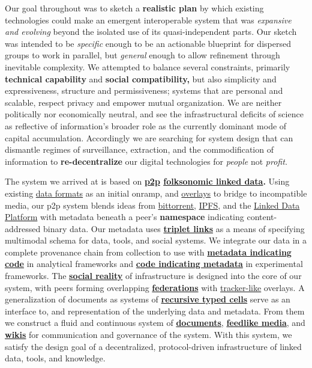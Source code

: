 Our goal throughout was to sketch a \textbf{realistic plan} by which
existing technologies could make an emergent interoperable system that
was \emph{expansive and evolving} beyond the isolated use of its
quasi-independent parts. Our sketch was intended to be \emph{specific}
enough to be an actionable blueprint for dispersed groups to work in
parallel, but \emph{general} enough to allow refinement through
inevitable complexity. We attempted to balance several constraints,
primarily \textbf{technical capability} and \textbf{social
compatibility,} but also simplicity and expressiveness, structure and
permissiveness; systems that are personal and scalable, respect privacy
and empower mutual organization. We are neither politically nor
economically neutral, and see the infrastructural deficits of science as
reflective of information's broader role as the currently dominant mode
of capital accumulation. Accordingly we are searching for system design
that can dismantle regimes of surveillance, extraction, and the
commodification of information to \textbf{re-decentralize} our digital
technologies for \emph{people} not \emph{profit.}

The system we arrived at is based on
\textbf{\protect\hyperlink{peer-to-peer-as-a-backbone}{p2p}
\protect\hyperlink{folk-federation}{folksonomic linked data}.} Using
existing \protect\hyperlink{formats-as-onramps}{data formats} as an
initial onramp, and
\protect\hyperlink{overlays--adversarial-interoperability}{overlays} to
bridge to incompatible media, our p2p system blends ideas from
\href{http://www.bittorrent.org/beps/bep_0003.html}{bittorrent},
\href{https://docs.ipfs.io/}{IPFS}, and the
\href{https://www.w3.org/TR/ldp/}{Linked Data Platform} with metadata
beneath a peer's \textbf{namespace} indicating content-addressed binary
data. Our metadata uses
\protect\hyperlink{the-core-format-of-linked-data-is-the-resource-document-format-r}{\textbf{triplet
links}} as a means of specifying multimodal schema for data, tools, and
social systems. We integrate our data in a complete provenance chain
from collection to use with
\protect\hyperlink{analytical-frameworks}{\textbf{metadata indicating
code}} in analytical frameworks and
\protect\hyperlink{experimental-frameworks}{\textbf{code indicating
metadata}} in experimental frameworks. The
\protect\hyperlink{infrastructure-is-social}{\textbf{social reality}} of
infrastructure is designed into the core of our system, with peers
forming overlapping
\protect\hyperlink{the-design-of-federations-of-peers-is-intended-to-resolve-severa}{\textbf{federations}}
with \protect\hyperlink{archives-need-communities}{tracker-like}
overlays. A generalization of documents as systems of
\protect\hyperlink{documents--notebooks}{\textbf{recursive typed cells}}
serve as an interface to, and representation of the underlying data and
metadata. From them we construct a fluid and continuous system of
\protect\hyperlink{documents--notebooks}{\textbf{documents}},
\protect\hyperlink{forums--feeds}{\textbf{feedlike media}}, and
\protect\hyperlink{trackers-clients--wikis}{\textbf{wikis}} for
communication and governance of the system. With this system, we satisfy
the design goal of a decentralized, protocol-driven infrastructure of
linked data, tools, and knowledge.

